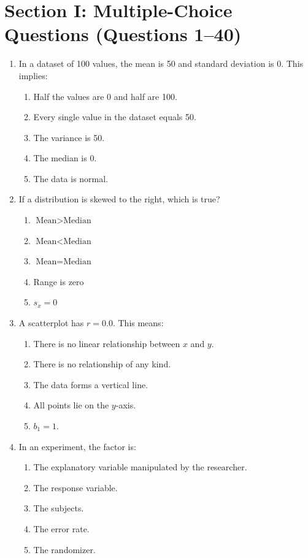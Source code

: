 \section{Section I: Multiple-Choice Questions (Questions 1--40)}
\begin{enumerate}[leftmargin=1.5em]
  \item In a dataset of 100 values, the mean is 50 and standard deviation is 0. This implies:
  \begin{enumerate}[label=(\Alph*)]
    \item Half the values are 0 and half are 100. \item Every single value in the dataset equals 50. \item The variance is 50. \item The median is 0. \item The data is normal.
  \end{enumerate}

  \item If a distribution is skewed to the right, which is true?
  \begin{enumerate}[label=(\Alph*)]
    \item $\text{Mean} > \text{Median}$ \item $\text{Mean} < \text{Median}$ \item $\text{Mean} = \text{Median}$ \item Range is zero \item $s_x = 0$
  \end{enumerate}

  \item A scatterplot has $r = 0.0$. This means:
  \begin{enumerate}[label=(\Alph*)]
    \item There is no linear relationship between $x$ and $y$. \item There is no relationship of any kind. \item The data forms a vertical line. \item All points lie on the $y$-axis. \item $b_1 = 1$.
  \end{enumerate}

  \item In an experiment, the factor is:
  \begin{enumerate}[label=(\Alph*)]
    \item The explanatory variable manipulated by the researcher. \item The response variable. \item The subjects. \item The error rate. \item The randomizer.
  \end{enumerate}


\end{enumerate}
